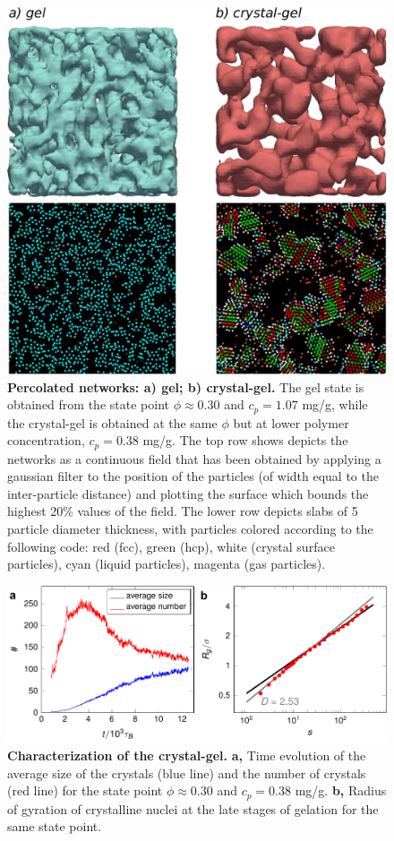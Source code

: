\documentclass[preprint,amsmath,amssymb,superscriptaddress]{revtex4}
\begin{document}
\begin{figure}[!t]
 \centering
 \includegraphics[width=12cm]{new_fig2}
\caption{{\bf Percolated networks: a) gel; b) crystal-gel.} The gel state is obtained from the state
point $\phi\approx 0.30$ and $c_p=1.07$ mg/g, while the crystal-gel is obtained at the same $\phi$ but
at lower polymer concentration, $c_p=0.38$ mg/g. The top row shows depicts the networks as a continuous field that has
been obtained by applying a gaussian filter to the position of the particles (of width equal to the inter-particle distance) and
plotting the surface which bounds the highest 20\% values of the field. The lower row depicts slabs of 5 particle diameter thickness,
with particles colored according to the following code: red (fcc), green (hcp), white (crystal surface particles), cyan (liquid particles), magenta (gas particles).} 
 \label{fig:network}
\end{figure}

\clearpage

\begin{figure}[!t]
 \centering
 \includegraphics{characterisation}
\caption{{\bf Characterization of the crystal-gel.} {\bf a,} Time evolution of the average size of the crystals (blue line) and the number of crystals (red line) for the state point $\phi\approx 0.30$ and $c_p=0.38$ mg/g. {\bf b,} Radius of gyration of crystalline nuclei at the late stages of gelation for the same state point.} 
 \label{fig:crystals}
\end{figure}
\end{document}
